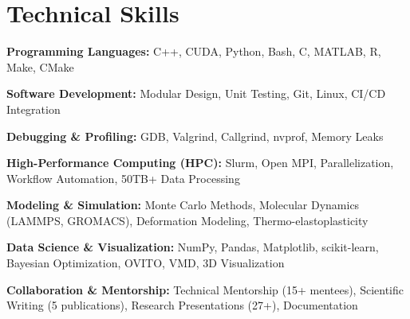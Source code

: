 \section*{Technical Skills}
\begin{tabitemize}
  \item \textbf{Programming Languages:} C++, CUDA, Python, Bash, C, MATLAB, R, Make, CMake
  \item \textbf{Software Development:} Modular Design, Unit Testing, Git, Linux, CI/CD Integration
  \item \textbf{Debugging \& Profiling:} GDB, Valgrind, Callgrind, nvprof, Memory Leaks
  \item \textbf{High-Performance Computing (HPC):} Slurm, Open MPI, Parallelization, Workflow Automation, 50TB+ Data Processing
  \item \textbf{Modeling \& Simulation:} Monte Carlo Methods, Molecular Dynamics (LAMMPS, GROMACS), Deformation Modeling, Thermo-elastoplasticity
  \item \textbf{Data Science \& Visualization:} NumPy, Pandas, Matplotlib, scikit-learn, Bayesian Optimization, OVITO, VMD, 3D Visualization
  \item \textbf{Collaboration \& Mentorship:} Technical Mentorship (15+ mentees), Scientific Writing (5 publications), Research Presentations (27+), Documentation
\end{tabitemize}
\vspace{-1.2\baselineskip}
